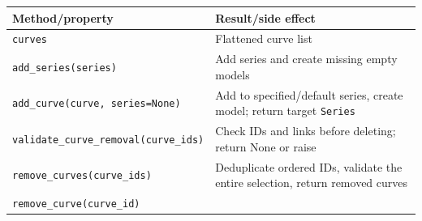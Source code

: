 \documentclass[
  10pt,
  a4paper,
  oneside]{scrreprt}
\begin{document}
\begin{longtable}[]{@{}ll@{}}
\toprule
\begin{minipage}[b]{0.47\columnwidth}\raggedright
Method/property\strut
\end{minipage} & \begin{minipage}[b]{0.47\columnwidth}\raggedright
Result/side effect\strut
\end{minipage}\tabularnewline
\midrule
\endhead
\begin{minipage}[t]{0.47\columnwidth}\raggedright
\texttt{curves}\strut
\end{minipage} & \begin{minipage}[t]{0.47\columnwidth}\raggedright
Flattened curve list\strut
\end{minipage}\tabularnewline
\begin{minipage}[t]{0.47\columnwidth}\raggedright
\texttt{add\_series(series)}\strut
\end{minipage} & \begin{minipage}[t]{0.47\columnwidth}\raggedright
Add series and create missing empty models\strut
\end{minipage}\tabularnewline
\begin{minipage}[t]{0.47\columnwidth}\raggedright
\texttt{add\_curve(curve,\ series=None)}\strut
\end{minipage} & \begin{minipage}[t]{0.47\columnwidth}\raggedright
Add to specified/default series, create model; return target
\texttt{Series}\strut
\end{minipage}\tabularnewline
\begin{minipage}[t]{0.47\columnwidth}\raggedright
\texttt{validate\_curve\_removal(curve\_ids)}\strut
\end{minipage} & \begin{minipage}[t]{0.47\columnwidth}\raggedright
Check IDs and links before deleting; return None or raise\strut
\end{minipage}\tabularnewline
\begin{minipage}[t]{0.47\columnwidth}\raggedright
\texttt{remove\_curves(curve\_ids)}\strut
\end{minipage} & \begin{minipage}[t]{0.47\columnwidth}\raggedright
Deduplicate ordered IDs, validate the entire selection, return removed
curves\strut
\end{minipage}\tabularnewline
\begin{minipage}[t]{0.47\columnwidth}\raggedright
\texttt{remove\_curve(curve\_id)}\strut

\end{minipage}
\end{longtable}
\end{document}
